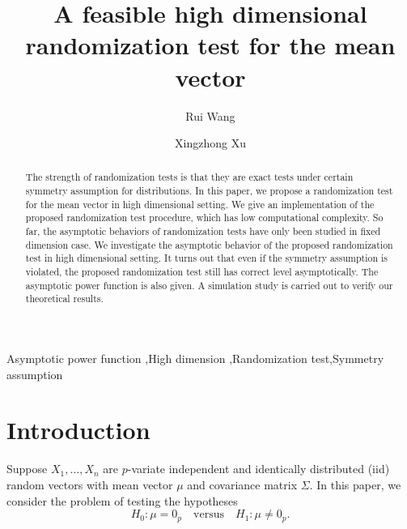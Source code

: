 \documentclass[3p]{elsarticle}
\theoremstyle{plain}
\theoremstyle{definition}
\theoremstyle{remark}
\begin{document}
\begin{frontmatter}
\title{A feasible high dimensional randomization test for the mean vector}

\author[mymainaddress]{Rui Wang}
\author[mymainaddress,mysecondaryaddress]{Xingzhong Xu}
\address[mymainaddress]{School of Mathematics and Statistics, Beijing Institute of Technology, Beijing 100081,China}
\address[mysecondaryaddress]{Beijing Key Laboratory on MCAACI, Beijing Institute of Technology, Beijing 100081,China}

\begin{abstract}
    The strength of randomization tests is that they are exact tests under certain symmetry assumption for distributions.
    In this paper, we propose a randomization test for the mean vector in high dimensional setting. 
    We give an implementation of the proposed randomization test procedure, which has low computational complexity.
    So far, the asymptotic behaviors of randomization tests have only been studied in fixed dimension case.
    We investigate the asymptotic behavior of the proposed randomization test in high dimensional setting.
    It turns out that even if the symmetry assumption is violated, the proposed randomization test still has correct level asymptotically.
    The asymptotic power function is also given.
    A simulation study is carried out to verify our theoretical results.
    

\end{abstract}

\begin{keyword}
   Asymptotic power function \sep High dimension \sep Randomization test\sep Symmetry assumption
\end{keyword}
\end{frontmatter}

\section{Introduction}

Suppose $X_{1},\ldots,X_{n}$ are $p$-variate independent and identically distributed (iid) random vectors with mean vector $\mu$ and covariance matrix $\Sigma$. In this paper, we consider the problem of testing the hypotheses
\begin{equation}\label{ourHy}
    H_0:\mu=0_p\quad \textrm{versus} \quad H_1:\mu\neq 0_p.
\end{equation}
\end{document}
